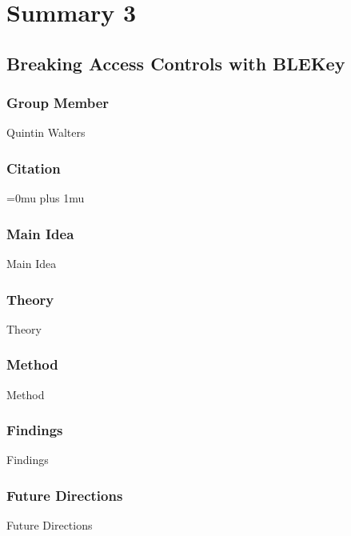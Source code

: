 \section{Summary 3}

\noindent
\subsection{Breaking Access Controls with BLEKey}

\subsubsection{Group Member}

\noindent
Quintin Walters

\noindent
\subsubsection{Citation}

\Urlmuskip=0mu plus 1mu\relax

\subsubsection{Main Idea}

\noindent
Main Idea

\subsubsection{Theory}

\noindent
Theory

\subsubsection{Method}

\noindent
Method

\subsubsection{Findings}

\noindent
Findings

\subsubsection{Future Directions}

\noindent
Future Directions 

